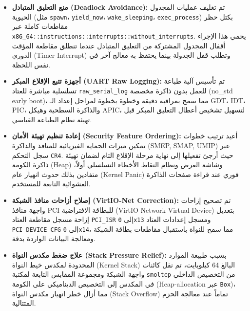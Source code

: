\documentclass[12pt,a4paper]{article}
\theoremstyle{definition}
\newcommand{\codeinline}[1]{\texttt{\small #1}}
\newcommand{\en}[1]{\textenglish{#1}}
\begin{document}
\begin{itemize}[leftmargin=2em]
\item \textbf{منع التعليق المتبادل (\en{Deadlock Avoidance}):}
تم تغليف عمليات المجدول الحيوية (مثل \codeinline{spawn}، \codeinline{yield\_now}، \codeinline{wake\_sleeping}، \codeinline{exec\_process}) بكتل حظر مقاطعات كاملة عبر \codeinline{x86\_64::instructions::interrupts::without\_interrupts}. يحمي هذا الإجراء أقفال المجدول المشتركة من التعليق المتبادل عندما تنطلق مقاطعة المؤقت الدوري (\en{Timer Interrupt}) وتطلب قفل الجدولة بينما يحتفظ به معالج آخر في نفس اللحظة.

\item \textbf{أجهزة تتبع الإقلاع المبكر (\en{UART Raw Logging}):}
تم تأسيس آلية طباعة تسلسلية مباشرة للعتاد \codeinline{raw\_serial\_log} للعمل بدون ذاكرة مخصصة (\en{no\_std early boot})، مما سمح بمراقبة دقيقة وخطوة بخطوة لمراحل إعداد الـ \en{GDT}، \en{IDT}، \en{PIC}، والذاكرة السطحية وهيكل APIC، لتسهيل تشخيص أعطال التعليق المبكر قبل تهيئة نظام الطباعة القياسي.

\item \textbf{إعادة تنظيم تهيئة الأمان (\en{Security Feature Ordering}):}
أعيد ترتيب خطوات تمكين ميزات الحماية الفيزيائية للمنافذ والذاكرة (\en{SMEP, SMAP, UMIP}) عبر سجل التحكم \codeinline{CR4}. حيث أرجئ تفعيلها إلى نهاية مرحلة الإقلاع التام لضمان تهيئة ذاكرة الكومة (\en{Heap}) وشاشة العرض ونظام التقاط الأخطاء التسلسلي أولاً، متفادين بذلك حدوث انهيار عام (\en{Kernel Panic}) فوري عند قراءة صفحات الذاكرة العشوائية التابعة للمستخدم.

\item \textbf{إصلاح أزاحات منافذ الشبكة (\en{VirtIO-Net Correction}):}
تم تصحيح إزاحات واجهة منافذ PCI للبطاقة الافتراضية (\en{VirtIO Network Virtual Device}) بتعديل إزاحة مسجل مقاطعة العتاد \codeinline{PCI\_ISR} إلى \codeinline{0x13} ومسجل إعدادات العتاد \codeinline{PCI\_DEVICE\_CFG} إلى \codeinline{0x14}، مما سمح للنواة باستقبال مقاطعات بطاقة الشبكة ومعالجة البيانات الواردة بدقة.

\item \textbf{علاج ضغط مكدس النواة (\en{Stack Pressure Relief}):}
بسبب طبيعة الموارد المحدودة لمكدس خيط النواة (\en{Kernel Stack}) البالغ 64 كيلوبايت، تم نقل كائنات واجهة الشبكة ومجموعة المقابس التابعة لمكتبة \codeinline{smoltcp} من التخصيص الداخلي في المكدس إلى التخصيص الديناميكي على الكومة (\en{Heap-allocation} عبر \codeinline{Box})، مما أزال خطر انهيار مكدس النواة (\en{Stack Overflow}) تماماً عند معالجة الحزم المتتالية.
\end{itemize}
\end{document}

